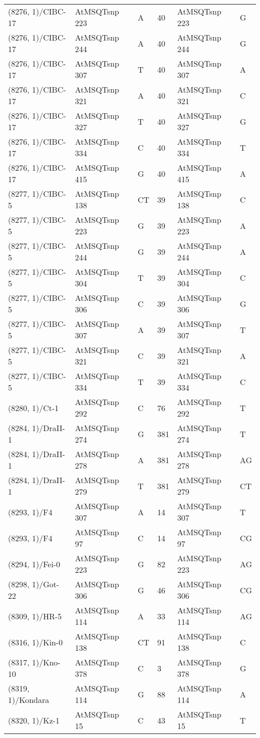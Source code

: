 \begin{center}
\begin{longtable}{|l|l|l|l|l|l|}
(8276, 1)/CIBC-17&AtMSQTsnp 223&A&40&AtMSQTsnp 223&G\\
(8276, 1)/CIBC-17&AtMSQTsnp 244&A&40&AtMSQTsnp 244&G\\
(8276, 1)/CIBC-17&AtMSQTsnp 307&T&40&AtMSQTsnp 307&A\\
(8276, 1)/CIBC-17&AtMSQTsnp 321&A&40&AtMSQTsnp 321&C\\
(8276, 1)/CIBC-17&AtMSQTsnp 327&T&40&AtMSQTsnp 327&G\\
(8276, 1)/CIBC-17&AtMSQTsnp 334&C&40&AtMSQTsnp 334&T\\
(8276, 1)/CIBC-17&AtMSQTsnp 415&G&40&AtMSQTsnp 415&A\\
(8277, 1)/CIBC-5&AtMSQTsnp 138&CT&39&AtMSQTsnp 138&C\\
(8277, 1)/CIBC-5&AtMSQTsnp 223&G&39&AtMSQTsnp 223&A\\
(8277, 1)/CIBC-5&AtMSQTsnp 244&G&39&AtMSQTsnp 244&A\\
(8277, 1)/CIBC-5&AtMSQTsnp 304&T&39&AtMSQTsnp 304&C\\
(8277, 1)/CIBC-5&AtMSQTsnp 306&C&39&AtMSQTsnp 306&G\\
(8277, 1)/CIBC-5&AtMSQTsnp 307&A&39&AtMSQTsnp 307&T\\
(8277, 1)/CIBC-5&AtMSQTsnp 321&C&39&AtMSQTsnp 321&A\\
(8277, 1)/CIBC-5&AtMSQTsnp 334&T&39&AtMSQTsnp 334&C\\
(8280, 1)/Ct-1&AtMSQTsnp 292&C&76&AtMSQTsnp 292&T\\
(8284, 1)/DraII-1&AtMSQTsnp 274&G&381&AtMSQTsnp 274&T\\
(8284, 1)/DraII-1&AtMSQTsnp 278&A&381&AtMSQTsnp 278&AG\\
(8284, 1)/DraII-1&AtMSQTsnp 279&T&381&AtMSQTsnp 279&CT\\
(8293, 1)/F4&AtMSQTsnp 307&A&14&AtMSQTsnp 307&T\\
(8293, 1)/F4&AtMSQTsnp 97&C&14&AtMSQTsnp 97&CG\\
(8294, 1)/Fei-0&AtMSQTsnp 223&G&82&AtMSQTsnp 223&AG\\
(8298, 1)/Got-22&AtMSQTsnp 306&G&46&AtMSQTsnp 306&CG\\
(8309, 1)/HR-5&AtMSQTsnp 114&A&33&AtMSQTsnp 114&AG\\
(8316, 1)/Kin-0&AtMSQTsnp 138&CT&91&AtMSQTsnp 138&C\\
(8317, 1)/Kno-10&AtMSQTsnp 378&C&3&AtMSQTsnp 378&G\\
(8319, 1)/Kondara&AtMSQTsnp 114&G&88&AtMSQTsnp 114&A\\
(8320, 1)/Kz-1&AtMSQTsnp 15&C&43&AtMSQTsnp 15&T\\

\end{longtable}
\end{center}
